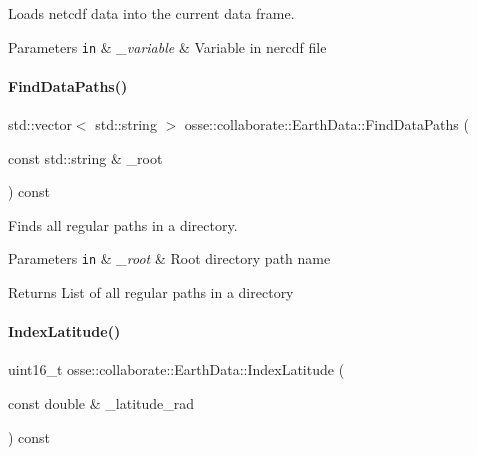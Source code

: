 Loads netcdf data into the current data frame. 


\begin{DoxyParams}[1]{Parameters}
\mbox{\tt in}  & {\em \+\_\+variable} & Variable in nercdf file \\
\hline
\end{DoxyParams}
\mbox{\label{classosse_1_1collaborate_1_1_earth_data_ab97521a1742be97c74a0aa538f8ad180}} 
\paragraph{\texorpdfstring{Find\+Data\+Paths()}{FindDataPaths()}}
{\footnotesize\ttfamily std\+::vector$<$ std\+::string $>$ osse\+::collaborate\+::\+Earth\+Data\+::\+Find\+Data\+Paths (\begin{DoxyParamCaption}\item[{const std\+::string \&}]{\+\_\+root }\end{DoxyParamCaption}) const\hspace{0.3cm}{\ttfamily [private]}}



Finds all regular paths in a directory. 


\begin{DoxyParams}[1]{Parameters}
\mbox{\tt in}  & {\em \+\_\+root} & Root directory path name \\
\hline
\end{DoxyParams}
\begin{DoxyReturn}{Returns}
List of all regular paths in a directory 
\end{DoxyReturn}
\mbox{\label{classosse_1_1collaborate_1_1_earth_data_a5c22945fb816aac16410d2641bba666c}} 
\paragraph{\texorpdfstring{Index\+Latitude()}{IndexLatitude()}}
{\footnotesize\ttfamily uint16\+\_\+t osse\+::collaborate\+::\+Earth\+Data\+::\+Index\+Latitude (\begin{DoxyParamCaption}\item[{const double \&}]{\+\_\+latitude\+\_\+rad }\end{DoxyParamCaption}) const\hspace{0.3cm}{\ttfamily [private]}}



